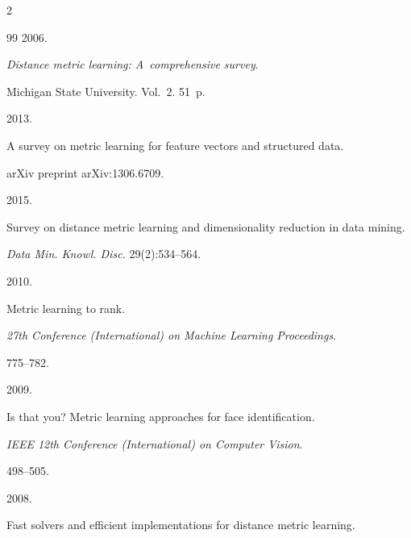 \begin{multicols}{2}
{{\begin{thebibliography}{99}
2006.


\textit{Distance metric learning: A~comprehensive survey}.


{Michigan State University}. Vol.~2. 51~p.









2013.


A survey on metric learning for feature vectors and structured data.


{arXiv preprint arXiv:1306.6709}.









2015.


Survey on distance metric learning and dimensionality reduction in data mining.


\textit{Data Min. Knowl. Disc.} 29(2):534--564.









2010.


Metric learning to rank.


\textit{27th  Conference (International) on Machine Learning Proceedings}.


775--782.









2009.


Is that you? Metric learning approaches for face identification.


\textit{IEEE 12th Conference (International) on Computer Vision}.


498--505.









2008.


Fast solvers and efficient implementations for distance metric learning.



\end{thebibliography}}}
\end{multicols}

